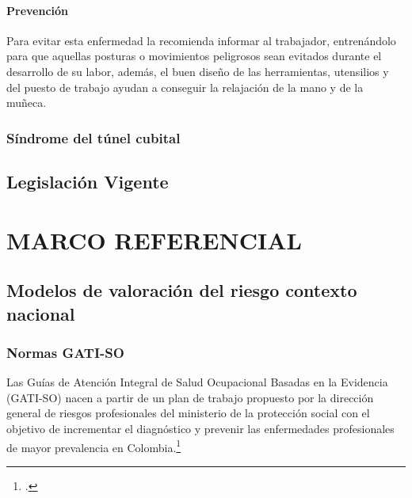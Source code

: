 \paragraph{Prevención}
Para evitar esta enfermedad la \parencite{FundacionSantaFedeBogota2016SindromeTratarlo} recomienda informar al trabajador, entrenándolo para que aquellas posturas o movimientos peligrosos sean evitados durante el desarrollo de su labor, además, el buen diseño de las herramientas, utensilios y del puesto de trabajo ayudan a conseguir la relajación de la mano y de la muñeca.

\subsubsection{Síndrome del túnel cubital}
\subsection{Legislación Vigente}
\section{MARCO REFERENCIAL}
\subsection{Modelos de valoración del riesgo contexto nacional}
\subsubsection{Normas GATI-SO}
Las Guías de Atención Integral de Salud Ocupacional Basadas en la Evidencia (GATI-SO) nacen a partir de un plan de trabajo propuesto por la dirección general de riesgos profesionales del ministerio de la protección social con el objetivo de incrementar el diagnóstico y prevenir las enfermedades profesionales de
mayor prevalencia en Colombia.\footcite[6]{MinisteriodeProteccionSocialdeColombia2006GuiaSuperiores}

